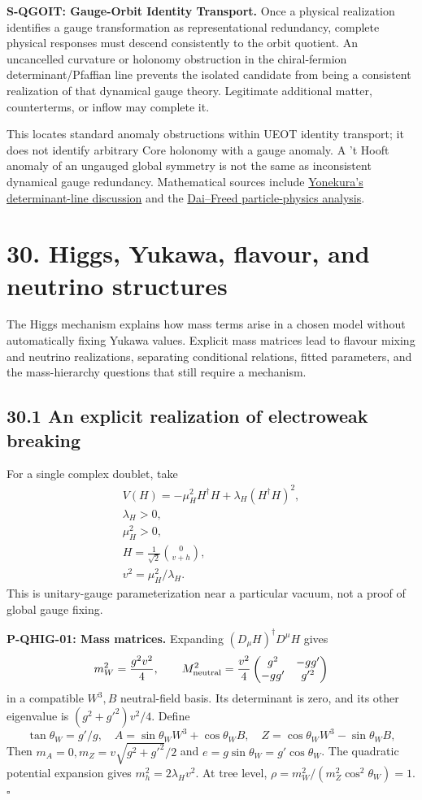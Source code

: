 \documentclass[
  11pt,
  oneside]{book}
\begin{document}
\textbf{S-QGOIT: Gauge-Orbit Identity Transport.} Once a physical
realization identifies a gauge transformation as representational
redundancy, complete physical responses must descend consistently to the
orbit quotient. An uncancelled curvature or holonomy obstruction in the
chiral-fermion determinant/Pfaffian line prevents the isolated candidate
from being a consistent realization of that dynamical gauge theory.
Legitimate additional matter, counterterms, or inflow may complete it.

This locates standard anomaly obstructions within UEOT identity
transport; it does not identify arbitrary Core holonomy with a gauge
anomaly. A 't Hooft anomaly of an ungauged global symmetry is not the
same as inconsistent dynamical gauge redundancy. Mathematical sources
include \href{https://arxiv.org/abs/1607.01873}{Yonekura's
determinant-line discussion} and the
\href{https://arxiv.org/abs/1808.00009}{Dai--Freed particle-physics
analysis}.

\chapter{30. Higgs, Yukawa, flavour, and neutrino
structures}\label{ch-30}

The Higgs mechanism explains how mass terms arise in a chosen model
without automatically fixing Yukawa values. Explicit mass matrices lead
to flavour mixing and neutrino realizations, separating conditional
relations, fitted parameters, and the mass-hierarchy questions that
still require a mechanism.

\section{30.1 An explicit realization of electroweak breaking}

For a single complex doublet, take \[
\begin{gathered}
V(H)=-\mu_H^2H^\dagger H+\lambda_H(H^\dagger H)^2,
\\ \lambda_H>0,\\ \mu_H^2>0,\\
H=\frac1{\sqrt2}\binom{0}{v+h},\\ v^2=\mu_H^2/\lambda_H.
\end{gathered}
\] This is unitary-gauge parameterization near a particular vacuum, not
a proof of global gauge fixing.

\label{p-qhig-01}{}

\textbf{P-QHIG-01: Mass matrices.} Expanding
\((D_\mu H)^\dagger D^\mu H\) gives \[
m_W^2=\frac{g^2v^2}{4},\qquad
M_{\rm neutral}^2=\frac{v^2}{4}
\begin{pmatrix}g^2&-gg'\\-gg'&g'^2\end{pmatrix}
\] in a compatible \(W^3,B\) neutral-field basis. Its determinant is
zero, and its other eigenvalue is \((g^2+g'^2)v^2/4\). Define \[
\tan\theta_W=g'/g,\quad
A=\sin\theta_W W^3+\cos\theta_W B,\quad
Z=\cos\theta_W W^3-\sin\theta_W B,
\] Then \(m_A=0,m_Z=v\sqrt{g^2+g'^2}/2\) and
\(e=g\sin\theta_W=g'\cos\theta_W\). The quadratic potential expansion
gives \(m_h^2=2\lambda_Hv^2\). At tree level,
\(\rho=m_W^2/(m_Z^2\cos^2\theta_W)=1\). \(\square\)
\end{document}
